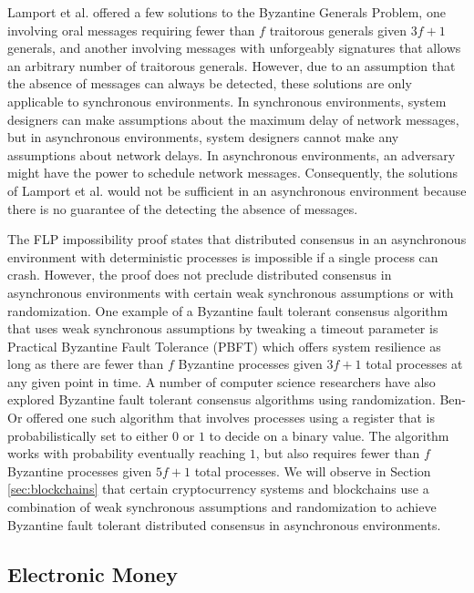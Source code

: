Lamport et al. offered a few solutions to the Byzantine Generals Problem,
one involving oral messages requiring fewer than $f$ traitorous generals given
$3f + 1$ generals, and another involving messages with unforgeably signatures
that allows an arbitrary number of traitorous generals. However, due to an
assumption that the absence of messages can always be detected, these solutions
are only applicable to synchronous environments. In synchronous environments,
system designers can make assumptions about the maximum delay of network
messages, but in asynchronous environments, system designers cannot make any
assumptions about network delays\cite{tendermint}. In asynchronous environments,
an adversary might have the power to schedule network messages. Consequently, the solutions
of Lamport et al. would not be sufficient in an asynchronous environment
because there is no guarantee of the detecting the absence of messages.

The FLP impossibility proof states that distributed consensus in an asynchronous
environment with deterministic processes is impossible if a single process can
crash\cite{FLP}. However, the proof does not preclude distributed consensus in
asynchronous environments with certain weak synchronous assumptions or with
randomization. One example of a Byzantine fault tolerant consensus
algorithm that uses weak synchronous assumptions by tweaking a timeout parameter is Practical Byzantine Fault Tolerance (PBFT) which offers system
resilience as long as there are fewer than $f$ Byzantine processes given $3f +
1$ total processes at any given point in time\cite{pbft}. A number of computer
science researchers have also explored Byzantine fault tolerant consensus
algorithms using randomization. Ben-Or offered one such algorithm that involves
processes using a register that is probabilistically set to either $0$ or $1$ to
decide on a binary value. The algorithm works with probability eventually
reaching $1$, but also requires fewer than $f$ Byzantine processes given $5f +1$
total processes\cite{freechoice}. We will observe in Section \ref{sec:blockchains}
that certain cryptocurrency systems and blockchains use a combination of weak
synchronous assumptions and randomization to achieve Byzantine fault tolerant
distributed consensus in asynchronous environments.

\subsection{Electronic Money}

